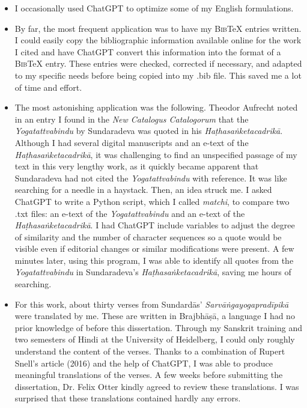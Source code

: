 \begin{itemize}
\item I occasionally used ChatGPT to optimize some of my English formulations.
\item By far, the most frequent application was to have my \textsc{Bib}\TeX{} entries written. I could easily copy the bibliographic information available online for the work I cited and have ChatGPT convert this information into the format of a \textsc{Bib}\TeX{} entry. These entries were checked, corrected if necessary, and adapted to my specific needs before being copied into my .bib file. This saved me a lot of time and effort.
\item The most astonishing application was the following. Theodor Aufrecht noted in an entry I found in the \textit{New Catalogus Catalogorum} that the \emph{Yogatattvabindu} by Sundaradeva was quoted in his \emph{Haṭhasaṅketacadrikā}. Although I had several digital manuscripts and an e-text of the \emph{Haṭhasaṅketacadrikā}, it was challenging to find an unspecified passage of my text in this very lengthy work, as it quickly became apparent that Sundaradeva had not cited the \emph{Yogatattvabindu} with reference. It was like searching for a needle in a haystack. Then, an idea struck me. I asked ChatGPT to write a Python script, which I called \textit{matchi}, to compare two .txt files: an e-text of the \emph{Yogatattvabindu} and an e-text of the \emph{Haṭhasaṅketacadrikā}. I had ChatGPT include variables to adjust the degree of similarity and the number of character sequences so a quote would be visible even if editorial changes or similar modifications were present. A few minutes later, using this program, I was able to identify all quotes from the \emph{Yogatattvabindu} in Sundaradeva's \emph{Haṭhasaṅketacadrikā}, saving me hours of searching.
\item For this work, about thirty verses from Sundardās' \emph{Sarvāṅgayogapradīpikā} were translated by me. These are written in Brajbhāṣā, a language I had no prior knowledge of before this dissertation. Through my Sanskrit training and two semesters of Hindi at the University of Heidelberg, I could only roughly understand the content of the verses. Thanks to a combination of Rupert Snell's article  (2016) and the help of ChatGPT, I was able to produce meaningful translations of the verses. A few weeks before submitting the dissertation, Dr. Felix Otter kindly agreed to review these translations. I was surprised that these translations contained hardly any errors.

\end{itemize}
